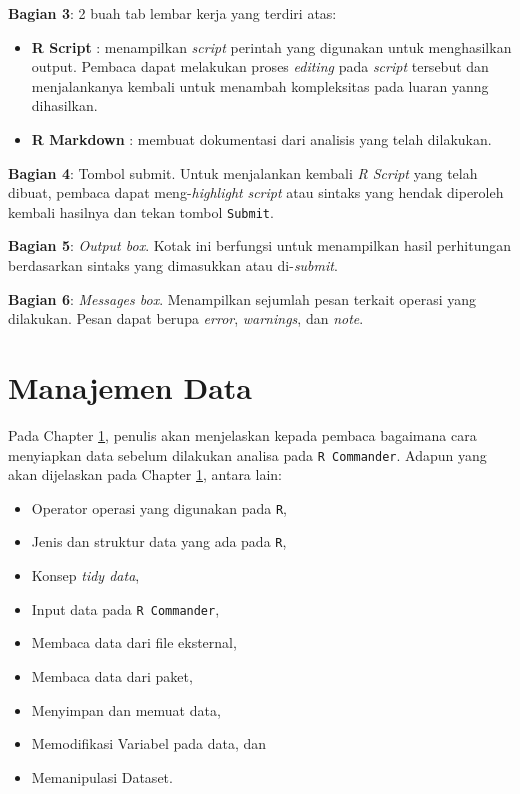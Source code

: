 \documentclass[12pt,]{krantz}
\providecommand{\tightlist}{%
  \setlength{\itemsep}{0pt}\setlength{\parskip}{0pt}}
\begin{document}
\textbf{Bagian 3}: 2 buah tab lembar kerja yang terdiri atas:

\begin{itemize}
\tightlist
\item
  \textbf{R Script} : menampilkan \emph{script} perintah yang digunakan untuk menghasilkan output. Pembaca dapat melakukan proses \emph{editing} pada \emph{script} tersebut dan menjalankanya kembali untuk menambah kompleksitas pada luaran yanng dihasilkan.
\item
  \textbf{R Markdown} : membuat dokumentasi dari analisis yang telah dilakukan.
\end{itemize}

\textbf{Bagian 4}: Tombol submit. Untuk menjalankan kembali \emph{R Script} yang telah dibuat, pembaca dapat meng-\emph{highlight} \emph{script} atau sintaks yang hendak diperoleh kembali hasilnya dan tekan tombol \texttt{Submit}.

\textbf{Bagian 5}: \emph{Output box}. Kotak ini berfungsi untuk menampilkan hasil perhitungan berdasarkan sintaks yang dimasukkan atau di-\emph{submit}.

\textbf{Bagian 6}: \emph{Messages box}. Menampilkan sejumlah pesan terkait operasi yang dilakukan. Pesan dapat berupa \emph{error}, \emph{warnings}, dan \emph{note}.

\hypertarget{datamanage}{%
\chapter{Manajemen Data}\label{datamanage}}

Pada Chapter \ref{datamanage}, penulis akan menjelaskan kepada pembaca bagaimana cara menyiapkan data sebelum dilakukan analisa pada \texttt{R\ Commander}. Adapun yang akan dijelaskan pada Chapter \ref{datamanage}, antara lain:

\begin{itemize}
\tightlist
\item
  Operator operasi yang digunakan pada \texttt{R},
\item
  Jenis dan struktur data yang ada pada \texttt{R},
\item
  Konsep \emph{tidy data},
\item
  Input data pada \texttt{R\ Commander},
\item
  Membaca data dari file eksternal,
\item
  Membaca data dari paket,
\item
  Menyimpan dan memuat data,
\item
  Memodifikasi Variabel pada data, dan
\item
  Memanipulasi Dataset.
\end{itemize}
\end{document}
